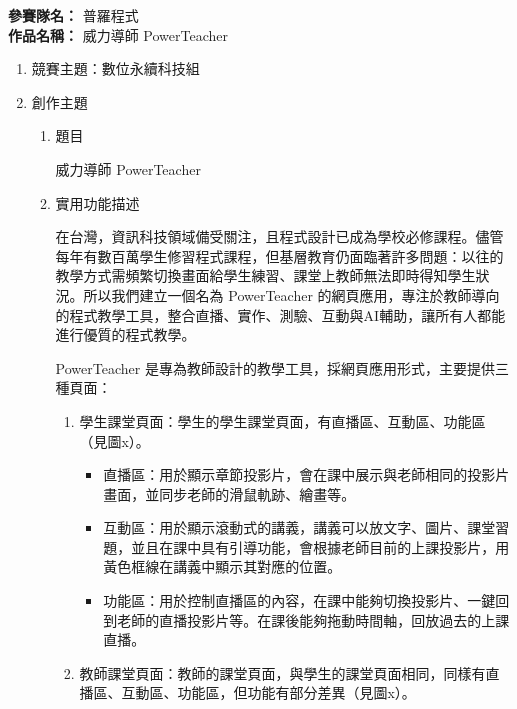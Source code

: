 \documentclass[12pt]{article}
\begin{document}
\date{}
\usetikzlibrary{automata, positioning, arrows}
{}

\noindent
\textbf{參賽隊名：} 普羅程式 \\
\textbf{作品名稱：} 威力導師 PowerTeacher \\

\begin{enumerate}
  \setlength{\parindent}{2em}
  \item 競賽主題：數位永續科技組 
  \item 創作主題
    \begin{enumerate}
      \setlength{\parindent}{2em}
      \item 題目
        \par 威力導師 PowerTeacher
      \item 實用功能描述
        \par 在台灣，資訊科技領域備受關注，且程式設計已成為學校必修課程。儘管每年有數百萬學生修習程式課程，但基層教育仍面臨著許多問題：以往的教學方式需頻繁切換畫面給學生練習、課堂上教師無法即時得知學生狀況。所以我們建立一個名為 PowerTeacher 的網頁應用，專注於教師導向的程式教學工具，整合直播、實作、測驗、互動與AI輔助，讓所有人都能進行優質的程式教學。
        \par PowerTeacher 是專為教師設計的教學工具，採網頁應用形式，主要提供三種頁面：
        \begin{enumerate}[label=(\arabic*)]
          \item 學生課堂頁面：學生的學生課堂頁面，有直播區、互動區、功能區（見圖x）。
            \begin{itemize}
              \item 直播區：用於顯示章節投影片，會在課中展示與老師相同的投影片畫面，並同步老師的滑鼠軌跡、繪畫等。
              \item 互動區：用於顯示滾動式的講義，講義可以放文字、圖片、課堂習題，並且在課中具有引導功能，會根據老師目前的上課投影片，用黃色框線在講義中顯示其對應的位置。
              \item 功能區：用於控制直播區的內容，在課中能夠切換投影片、一鍵回到老師的直播投影片等。在課後能夠拖動時間軸，回放過去的上課直播。
            \end{itemize}
          \item 教師課堂頁面：教師的課堂頁面，與學生的課堂頁面相同，同樣有直播區、互動區、功能區，但功能有部分差異（見圖x）。

\end{enumerate}
\end{enumerate}
\end{enumerate}
\end{document}
